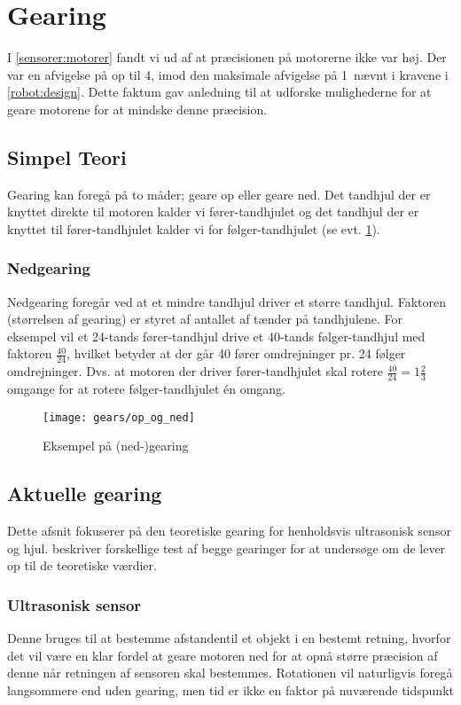 \section{Gearing}\label{robot:gearing}
I \cref{sensorer:motorer} fandt vi ud af at præcisionen på motorerne ikke var høj.
Der var en afvigelse på op til 4\dg, imod den maksimale afvigelse på 1\dg ~nævnt i kravene i \cref{robot:design}.
Dette faktum gav anledning til at udforske mulighederne for at geare motorene for at mindske denne præcision.

\subsection{Simpel Teori}\label{gearing:simpel_teori}
Gearing kan foregå på to måder; geare op eller geare ned.
Det tandhjul der er knyttet direkte til motoren kalder vi fører-tandhjulet og det tandhjul der er knyttet til fører-tandhjulet kalder vi for følger-tandhjulet (se evt. \cref{gearing:nedgearing}).

\subsubsection{Nedgearing}
Nedgearing foregår ved at et mindre tandhjul driver et større tandhjul.
Faktoren (størrelsen af gearing) er styret af antallet af tænder på tandhjulene.
For eksempel vil et 24-tands fører-tandhjul drive et 40-tands følger-tandhjul med faktoren $\frac{40}{24}$, hvilket betyder at der går 40 fører omdrejninger pr. 24 følger omdrejninger. Dvs. at motoren der driver fører-tandhjulet skal rotere $\frac{40}{24} = 1 \frac{2}{3}$ omgange for at rotere følger-tandhjulet én omgang.

\begin{figure}[h]
\centering
\texttt{[image: gears/op\_og\_ned]}
\caption{Eksempel på (ned-)gearing}
\label{gearing:nedgearing}
\end{figure}

\subsection{Aktuelle gearing}
Dette afsnit fokuserer på den teoretiske gearing for henholdsvis ultrasonisk sensor og hjul.
 beskriver forskellige test af begge gearinger for at undersøge om de lever op til de teoretiske værdier.


\subsubsection{Ultrasonisk sensor}
Denne bruges til at bestemme afstandentil et objekt i en bestemt retning, hvorfor det vil være en klar fordel at geare motoren ned for at opnå større præcision af denne når retningen af sensoren skal bestemmes.
Rotationen vil naturligvis foregå langsommere end uden gearing, men tid er ikke en faktor på nuværende tidspunkt

